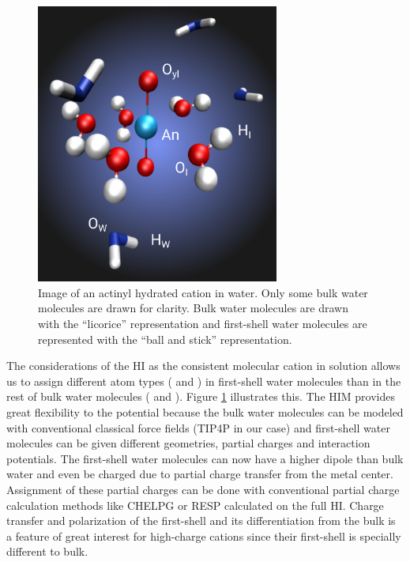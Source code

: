 \begin{figure}
\centering 
\includegraphics[width=8cm]{./images/HI_labels.png}
\caption[Hydrated ion atom types]{Image of an actinyl hydrated cation  in 
water. Only some bulk water molecules are drawn for clarity. Bulk water molecules are drawn with 
the ``licorice'' representation and first-shell water molecules are represented with the ``ball and 
stick'' representation.}
\label{HI_labels}
\end{figure}

The considerations of the HI as the consistent molecular cation in solution allows us to assign 
different atom types ( and 
) in first-shell water molecules than in the rest of bulk water molecules ( 
and ). Figure \ref{HI_labels} illustrates this. The HIM provides great flexibility to 
the 
potential 
because the bulk water molecules can 
be modeled with conventional classical force fields (TIP4P in our case) and first-shell water 
molecules can be given different 
geometries, partial charges and interaction potentials. The first-shell water molecules can now 
have 
a higher dipole than bulk water and even be charged due to partial charge transfer from the metal 
center. Assignment of these partial charges can be done with conventional partial charge 
calculation methods like CHELPG or RESP calculated on the full HI. Charge transfer and polarization 
of the first-shell and its differentiation from the bulk is a feature of great interest for 
high-charge cations since their first-shell is specially different to bulk.


